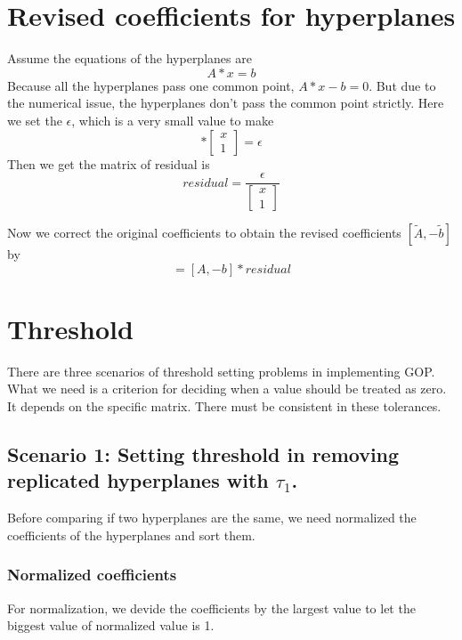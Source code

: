 \documentclass[11pt]{amsart}
\begin{document}
\section{Revised coefficients for hyperplanes}
Assume the equations of the hyperplanes are
\begin{equation}
 A*x = b
\end{equation}
Because all the hyperplanes pass one common point, $A*x-b=0$.
But due to the numerical issue, the hyperplanes don't pass the common point strictly.
Here we set the $\epsilon$, which is a very small value to make
\begin{equation}
 [A, -b]*\begin{bmatrix}x\\1
\end{bmatrix} = \epsilon
\end{equation}
Then we get the matrix of residual is
\begin{equation}
 residual = \frac{\epsilon}{\begin{bmatrix}x\\1
\end{bmatrix}}
\end{equation}

Now we correct the original coefficients to obtain the revised coefficients $[\tilde{A},-\tilde{b}]$ by
\begin{equation}
 [\tilde{A},-\tilde{b}] = [A,-b]*residual
\end{equation}


\section{Threshold}
There are three scenarios of threshold setting problems in implementing GOP. What we need is a criterion for deciding when a value should be treated as zero. It depends on the specific matrix.
There must be consistent in these tolerances.

\subsection{Scenario 1: Setting threshold in removing replicated hyperplanes with $\tau_1$.}
Before comparing if two hyperplanes are the same, we need normalized the coefficients of the hyperplanes and sort them.
\subsubsection{Normalized coefficients}
For normalization, we devide the coefficients by the largest value to let the biggest value of normalized value is 1.
\end{document}

